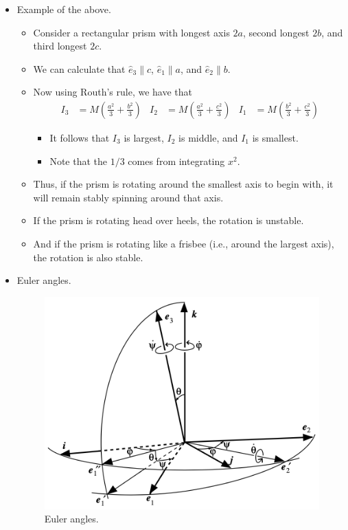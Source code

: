 \documentclass[../notes.tex]{subfiles}
\begin{document}
\begin{itemize}
\begin{itemize}
    \end{itemize}
    \item Example of the above.
    \begin{itemize}
        \item Consider a rectangular prism with longest axis $2a$, second longest $2b$, and third longest $2c$.
        \item We can calculate that $\hat{e}_3\parallel c$, $\hat{e}_1\parallel a$, and $\hat{e}_2\parallel b$.
        \item Now using Routh's rule, we have that
        \begin{align*}
            I_3 &= M\left( \frac{a^2}{3}+\frac{b^2}{3} \right)&
            I_2 &= M\left( \frac{a^2}{3}+\frac{c^2}{3} \right)&
            I_1 &= M\left( \frac{b^2}{3}+\frac{c^2}{3} \right)
        \end{align*}
        \begin{itemize}
            \item It follows that $I_3$ is largest, $I_2$ is middle, and $I_1$ is smallest.
            \item Note that the $1/3$ comes from integrating $x^2$.
        \end{itemize}
        \item Thus, if the prism is rotating around the smallest axis to begin with, it will remain stably spinning around that axis.
        \item If the prism is rotating head over heels, the rotation is unstable.
        \item And if the prism is rotating like a frisbee (i.e., around the largest axis), the rotation is also stable.
    \end{itemize}
    \item Euler angles.
    \begin{figure}[h!]
        \centering
        \includegraphics[width=0.47\linewidth]{../ExtFiles/EulerAngles.png}
        \caption{Euler angles.}
        \label{fig:EulerAngles}
    \end{figure}

\end{itemize}
\end{document}
